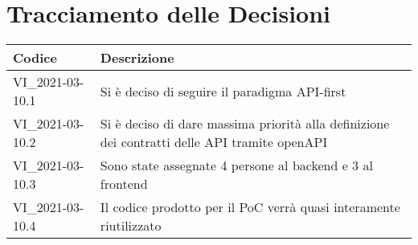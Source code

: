 \section*{Tracciamento delle Decisioni}

\begin{center}
	\begin{longtable}{|p{3.5cm}|p{11cm}|}
	\hline
	\rowcolor{lighter-grayer}
	\textbf{Codice} & \textbf{Descrizione} \\
	\hline
	\endfirsthead
	\hline
	VI\_2021-03-10.1 & Si è deciso di seguire il paradigma API-first \\
	VI\_2021-03-10.2 & Si è deciso di dare massima priorità alla definizione dei contratti delle API tramite openAPI \\
	VI\_2021-03-10.3 & Sono state assegnate 4 persone al backend e 3 al frontend \\
	VI\_2021-03-10.4 & Il codice prodotto per il PoC verrà quasi interamente riutilizzato \\
	\hline

	\end{longtable}
\end{center}
